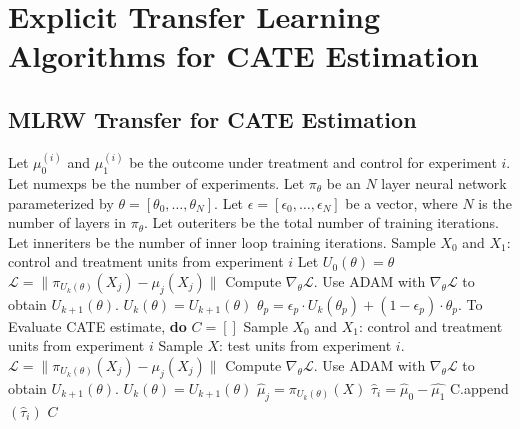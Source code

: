 \section{Explicit Transfer Learning Algorithms for CATE Estimation}
\label{app:transfer.algos}



\subsection{MLRW Transfer for CATE Estimation}



\begin{algorithm}[H]
	\caption{MLRW Transfer for Cate Estimation.}
	\label{alg:sf-reptile-meta-regression}
	\begin{algorithmic}[1]
		\State Let $\mu_0^{(i)}$ and $\mu_1^{(i)}$ be the outcome under treatment and control for experiment $i$. 
		\State Let numexps be the number of experiments. 
		\State Let $\pi_\theta$ be an $N$ layer neural network parameterized by $\theta = \left[\theta_0, \dots, \theta_{N} \right]$.
		\State Let $\epsilon = \left[\epsilon_0, \dots, \epsilon_{N} \right]$ be a vector, where $N$ is the number of layers in $\pi_\theta$. 
		\State Let outeriters be the total number of training iterations. 
		\State Let inneriters be the number of inner loop training iterations.
		\State Sample $X_0$ and $X_1$: control and treatment units from experiment $i$
		 
		\State Let $U_0(\theta) = \theta$
		\State $\mathcal{L} = \| \pi_{U_k(\theta)} (X_j) - \mu_j(X_j) \|$
		\State Compute $\nabla_\theta \mathcal{L}$. 
		\State Use ADAM with $\nabla_\theta \mathcal{L}$ to obtain $U_{k+1}(\theta)$. 
		\State $U_k (\theta) = U_{k+1}(\theta)$
		\EndFor
		\State $\theta_p = \epsilon_p \cdot U_k(\theta_p) + (1 - \epsilon_p) \cdot \theta_p$.  
		\EndFor
		\EndFor
		\EndFor
		\EndFor
		\State To Evaluate CATE estimate, \textbf{do}
		\State $C = []$
		\State Sample $X_0$ and $X_1$: control and treatment units from experiment $i$
		\State Sample $X$: test units from experiment $i$. 
		 
		\State $\mathcal{L} = \| \pi_{U_k(\theta)} (X_j) - \mu_j(X_j) \|$
		\State Compute $\nabla_\theta \mathcal{L}$. 
		\State Use ADAM with $\nabla_\theta \mathcal{L}$ to obtain $U_{k+1}(\theta)$. 
		\State $U_k (\theta) = U_{k+1}(\theta)$
		\EndFor
		\State $\hat{\mu}_j = \pi_{U_k(\theta)} (X)$
		\EndFor
		\State  $\hat{\tau}_i = \hat{\mu}_0 - \hat{\mu_1}$
		\State C.append$(\hat{\tau}_i)$
		\EndFor
		 $C$
	\end{algorithmic}
\end{algorithm}


